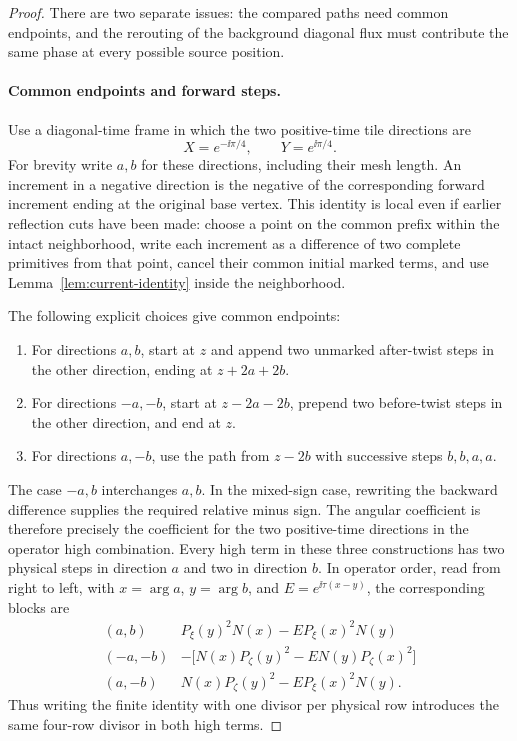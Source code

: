 \begin{proof}
There are two separate issues: the compared paths need common
endpoints, and the rerouting of the background diagonal flux must
contribute the same phase at every possible source position.

\paragraph{Common endpoints and forward steps.}
Use a diagonal-time frame in which the two positive-time tile
directions are
\[
 X=e^{-\ii\pi/4},\qquad Y=e^{\ii\pi/4}.
\]
For brevity write $a,b$ for these directions, including their mesh
length.  An increment in a negative direction is the negative of
the corresponding forward increment ending at the original base
vertex.  This identity is local even if earlier reflection cuts have
been made: choose a point on the common prefix within the intact
neighborhood, write each increment as a difference of two complete
primitives from that point, cancel their common initial marked
terms, and use Lemma~\ref{lem:current-identity} inside the neighborhood.

The following explicit choices give common endpoints:
\begin{enumerate}[label=(\roman*)]
\item For directions $a,b$, start at $z$ and append two unmarked
after-twist steps in the other direction, ending at $z+2a+2b$.
\item For directions $-a,-b$, start at $z-2a-2b$, prepend two
before-twist steps in the other direction, and end at $z$.
\item For directions $a,-b$, use the path from $z-2b$ with successive
steps $b,b,a,a$.
\end{enumerate}
The case $-a,b$ interchanges $a,b$.  In the mixed-sign case, rewriting
the backward difference supplies the required relative minus sign.
The angular coefficient is therefore precisely the coefficient for
the two positive-time directions in the operator high combination.
Every high term in these three constructions has two physical steps
in direction $a$ and two in direction $b$.  In operator order, read
from right to left, with $x=\arg a$, $y=\arg b$, and
$E=e^{\ii\tau(x-y)}$, the corresponding blocks are
\begin{equation}
\begin{array}{c|l}
 (a,b)&P_\xi(y)^2N(x)-E P_\xi(x)^2N(y)\\
 (-a,-b)&-\bigl[N(x)P_\zeta(y)^2-E N(y)P_\zeta(x)^2\bigr]\\
 (a,-b)&N(x)P_\zeta(y)^2-E P_\xi(x)^2N(y).
\end{array}
\label{calc:common-endpoint-blocks}
\end{equation}
Thus writing the finite identity with one divisor per physical row
introduces the same four-row divisor in both high terms.


\end{proof}

